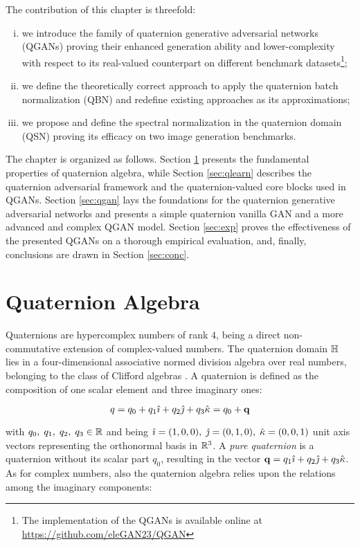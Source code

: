 \documentclass[graybox]{svmult}
\begin{document}
The contribution of this chapter is threefold: 
\begin{enumerate}[i)]
    \item we introduce the family of quaternion generative adversarial networks (QGANs) proving their enhanced generation ability and lower-complexity with respect to its real-valued counterpart on different benchmark datasets\footnote{The implementation of the QGANs is available online at \url{https://github.com/eleGAN23/QGAN}};
    \item we define the theoretically correct approach to apply the quaternion batch normalization (QBN) and redefine existing approaches as its approximations; 
    \item we propose and define the spectral normalization in the quaternion domain (QSN) proving its efficacy on two image generation benchmarks.
\end{enumerate}

The chapter is organized as follows. Section \ref{sec:qalg} presents the fundamental properties of quaternion algebra, while Section \ref{sec:qlearn} describes the quaternion adversarial framework and the quaternion-valued core blocks used in QGANs. Section \ref{sec:qgan} lays the foundations for the quaternion generative adversarial networks and presents a simple quaternion vanilla GAN and a more advanced and complex QGAN model. Section \ref{sec:exp} proves the effectiveness of the presented QGANs on a thorough empirical evaluation, and, finally, conclusions are drawn in Section \ref{sec:conc}.


\section{Quaternion Algebra}
\label{sec:qalg}
\noindent Quaternions are hypercomplex numbers of rank $4$, being a direct non-commutative extension of complex-valued numbers. The quaternion domain $\mathbb{H}$ lies in a four-dimensional associative normed division algebra over real numbers, belonging to the class of Clifford algebras \cite{Ward1997}.
A quaternion is defined as the composition of one scalar element and three imaginary ones:

\begin{equation}
\label{eq:q}
    q = q_0 + q_1 {\hat{\imath}} + q_2 {\hat{\jmath}} + q_3 {\hat{\kappa}} = q_0 + \mathbf{q}
\end{equation}

\noindent with $q_0, \; q_1, \; q_2, \; q_3 \in \mathbb{R}$ and being ${\hat{\imath}} = (1,0,0), \; {\hat{\jmath}}=(0,1,0), \; {\hat{\kappa}}=(0,0,1)$ unit axis vectors representing the orthonormal basis in $\mathbb{R}^3$. A \textit{pure quaternion} is a quaternion without its scalar part $q_0$, resulting in the vector $\mathbf{q} = q_1 {\hat{\imath}} + q_2 {\hat{\jmath}} + q_3 {\hat{\kappa}}$. As for complex numbers, also the quaternion algebra relies upon the relations among the imaginary components:
\end{document}
